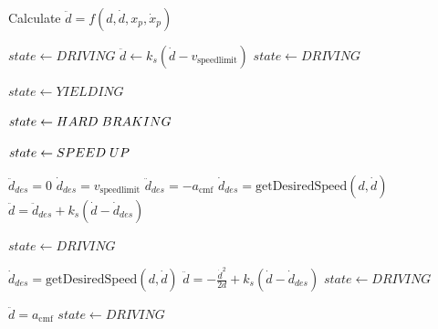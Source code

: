 \documentclass[letterpaper, 10 pt, conference]{ieeeconf}  %
\begin{document}
\begin{algorithm} %
\caption{Calculate $\ddot{d} = f(d, \dot{d}, x_p, \dot{x}_p)$} %
\label{alg:hybridController} %
\begin{algorithmic}
\State $state \leftarrow DRIVING$
	\State $\ddot{d} \gets k_s(\dot{d}-v_\mathrm{speed limit})$ 
		\State $state \leftarrow DRIVING$
		
		\State $state \leftarrow YIELDING$

	\State $state \leftarrow HARD\hspace{1mm}BRAKING$

	\Else
	\State $state \leftarrow SPEED\hspace{1mm}UP$

	\EndIf
	\EndIf
	\EndIf
\vspace{3mm}
	\State $\ddot{d}_{des} = 0$
	\State $\dot{d}_{des} = v_\mathrm{speed limit}$
\Else 
	\State $\ddot{d}_{des} = -a_\mathrm{cmf}$
	\State $\dot{d}_{des} = \mathrm{getDesiredSpeed}(d, \dot{d})$
\EndIf 
	\State $\ddot{d} = \ddot{d}_{des} + k_s(\dot{d} - \dot{d}_{des})$

 \State $state \leftarrow DRIVING$

\EndIf
\EndIf

\vspace{3mm}

	\State $\dot{d}_{des} = \mathrm{getDesiredSpeed}(d, \dot{d})$
	\State $\ddot{d} = -\frac{\dot{d}^2}{2d} + k_s(\dot{d} - \dot{d}_{des})$ 	
	 \State $state \leftarrow DRIVING$

	\EndIf
	\EndIf


\EndIf
{}
	\State $\ddot{d} = a_\mathrm{cmf}$ 	
	 \State $state \leftarrow DRIVING$

	\EndIf
	\EndIf


\EndWhile

\end{algorithmic}
\end{algorithm}
\end{document}
